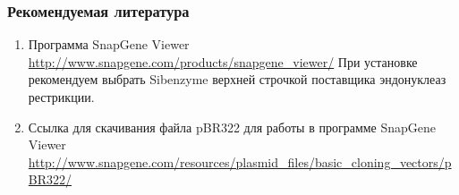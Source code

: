 \subsubsection*{Рекомендуемая литература}

\begin{enumerate}
    \item Программа SnapGene Viewer \url{http://www.snapgene.com/products/snapgene_viewer/} При установке рекомендуем выбрать Sibenzyme верхней строчкой поставщика эндонуклеаз рестрикции. 
    \item Ссылка для скачивания файла pBR322 для работы в программе SnapGene Viewer \url{http://www.snapgene.com/resources/plasmid_files/basic_cloning_vectors/pBR322/}
\end{enumerate}